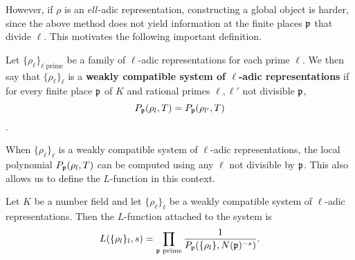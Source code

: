 However, if $\rho$ is an $ell$-adic representation, constructing a global object is harder, since the above method does not yield information at the finite places $\mathfrak{p}$ that divide $\ell$. This motivates the following important definition.

\begin{defn}
    Let $\{\rho_\ell\}_{\ell\text{ prime}}$ be a family of $\ell$-adic representations for each prime $\ell$. We then say that $\{\rho_\ell\}_\ell$ is a \textbf{weakly compatible system of $\ell$-adic representations} if for every finite place $\mathfrak{p}$ of $K$ and rational primes $\ell,\ell'$ not divisible $\mathfrak{p}$, 
    $$P_{\mathfrak{p}}(\rho_l,T)=P_{\mathfrak{p}}(\rho_{l'},T)$$.
\end{defn}

When $\{\rho_\ell\}_\ell$ is a weakly compatible system of $\ell$-adic representations, the local polynomial $P_{\mathfrak{p}}(\rho_l,T)$ can be computed using any $\ell$ not divisible by $\mathfrak{p}$. This also allows us to define the $L$-function in this context.

\begin{defn}
    Let $K$ be a number field and let $\{\rho_\ell\}_\ell$ be a weakly compatible system of $\ell$-adic representations. Then the $L$-function attached to the system is 
    $$L(\{\rho_l\}_l, s)=\prod_{\mathfrak{p}\text{ prime}}\frac{1}{P_{\mathfrak{p}}(\{\rho_l\},N(\mathfrak{p})^{-s})}.$$
\end{defn}




